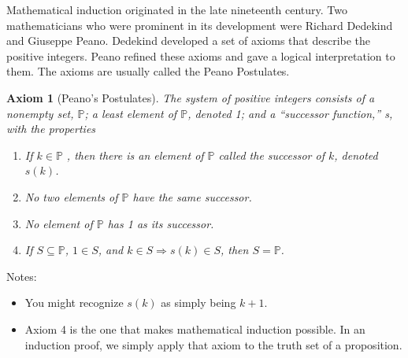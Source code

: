 \documentclass[10pt,]{book}
\theoremstyle{plain}
\newtheorem{axiom}[theorem]{Axiom}
\theoremstyle{definition}
\theoremstyle{definition}
\theoremstyle{definition}
\theoremstyle{definition}
\begin{document}
\par
Mathematical induction originated in the late nineteenth century. Two mathematicians who were prominent in its development were Richard Dedekind and Giuseppe Peano. Dedekind developed a set of axioms that describe the positive integers. Peano refined these axioms and gave a logical interpretation to them. The axioms are usually called the Peano Postulates.%
\begin{axiom}[Peano's Postulates}]\label{sss-peano-postulates}
 The system of positive integers consists of a nonempty set, \(\mathbb{P}\); a least element of \(\mathbb{P}\), denoted 1; and a
``successor function,'' s, with the properties%
\par
\leavevmode%
\begin{enumerate}[label=\arabic*]
\item\hypertarget{li-269}{} If \(k \in  \mathbb{P}\) , then there is an element of \(\mathbb{P}\) called the successor of \(k\), denoted \(s(k)\).%
\item\hypertarget{li-270}{}  No two elements of \(\mathbb{P}\) have the same successor.%
\item\hypertarget{li-271}{}  No element of \(\mathbb{P}\) has 1 as its successor.%
\item\hypertarget{li-272}{} If \(S \subseteq  \mathbb{P}\), \(1 \in  S\), and \(k \in S \Rightarrow  s(k) \in  S\), then \(S = \mathbb{P}\).%
\end{enumerate}

%
\end{axiom}
\par
Notes:
\leavevmode%
\begin{itemize}[label=\textbullet]
\item{} You might recognize \(s(k)\) as simply being \(k + 1\).%
\item{} Axiom 4 is the one that makes mathematical induction possible. In an induction proof, we simply apply that axiom to the truth set of a proposition.%
\end{itemize}
%
\typeout{************************************************}
\typeout{************************************************}
\end{document}
